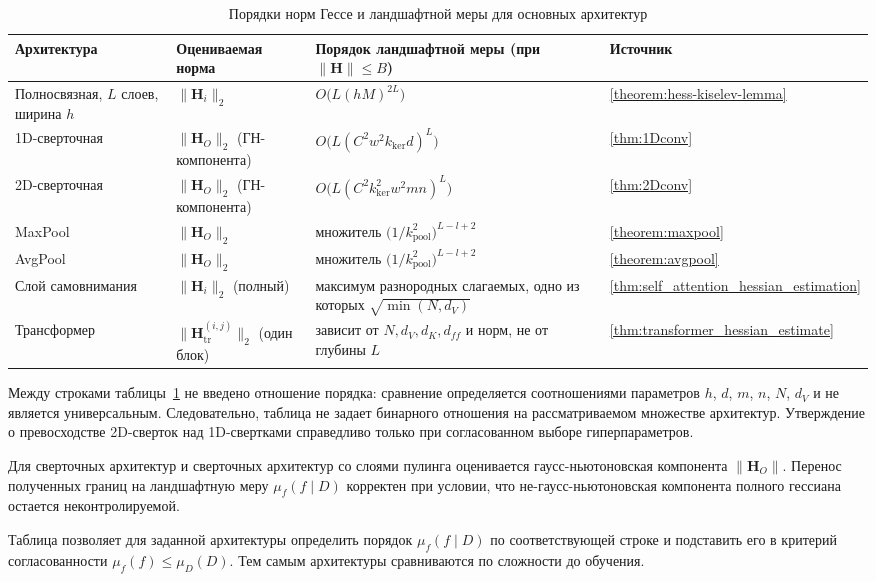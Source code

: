 \begin{table}[ht]
  \centering
  \caption{Порядки норм Гессе и ландшафтной меры для основных архитектур}
  \label{ch2:tab:hess-orders}
  \small
  \begin{tabularx}{\textwidth}{@{}l l X l@{}}
    \toprule
    Архитектура & Оцениваемая норма & Порядок ландшафтной меры (при $\|\mathbf{H}\|\le B$) & Источник \\
    \midrule
    Полносвязная, $L$ слоев, ширина $h$ & $\|\mathbf{H}_i\|_2$ & $O\bigl(L(hM)^{2L}\bigr)$ & \ref{theorem:hess-kiselev-lemma} \\
    1D-сверточная & $\|\mathbf{H}_O\|_2$ (ГН-компонента) & $O\bigl(L(C^2w^2k_{\mathrm{ker}}d)^L\bigr)$ & \ref{thm:1Dconv} \\
    2D-сверточная & $\|\mathbf{H}_O\|_2$ (ГН-компонента) & $O\bigl(L(C^2k_{\mathrm{ker}}^2w^2mn)^L\bigr)$ & \ref{thm:2Dconv} \\
    MaxPool & $\|\mathbf{H}_O\|_2$ & множитель $\bigl(1/k_{\mathrm{pool}}^2\bigr)^{L-l+2}$ & \ref{theorem:maxpool} \\
    AvgPool & $\|\mathbf{H}_O\|_2$ & множитель $\bigl(1/k_{\mathrm{pool}}^2\bigr)^{L-l+2}$ & \ref{theorem:avgpool} \\
    Слой самовнимания & $\|\mathbf{H}_i\|_2$ (полный) & максимум разнородных слагаемых, одно из которых $\sqrt{\min(N,d_V)}$ & \ref{thm:self_attention_hessian_estimation} \\
    Трансформер & $\|\mathbf{H}_{\mathrm{tr}}^{(i,j)}\|_2$ (один блок) & зависит от $N,d_V,d_K,d_{ff}$ и норм, не от глубины $L$ & \ref{thm:transformer_hessian_estimate} \\
    \bottomrule
  \end{tabularx}
\end{table}

\begin{remark}\label{ch2:rem:summary-orders}
Между строками таблицы~\ref{ch2:tab:hess-orders} не введено отношение порядка: сравнение определяется соотношениями параметров $h$, $d$, $m$, $n$, $N$, $d_V$ и не является универсальным. Следовательно, таблица не задает бинарного отношения на рассматриваемом множестве архитектур. Утверждение о превосходстве 2D-сверток над 1D-свертками справедливо только при согласованном выборе гиперпараметров.

Для сверточных архитектур и сверточных архитектур со слоями пулинга оценивается гаусс-ньютоновская компонента $\|\mathbf{H}_O\|$. Перенос полученных границ на ландшафтную меру $\mu_f(f\mid D)$ корректен при условии, что не-гаусс-ньютоновская компонента полного гессиана остается неконтролируемой.

Таблица позволяет для заданной архитектуры определить порядок $\mu_f(f\mid D)$ по соответствующей строке и подставить его в критерий согласованности $\mu_f(f)\le\mu_D(D)$. Тем самым архитектуры сравниваются по сложности до обучения.
\end{remark}

